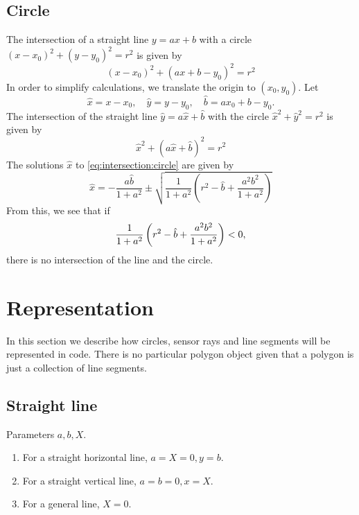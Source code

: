 \documentclass[11pt]{article}
\newcommand{\bhat}{{\hat{b}}}
\newcommand{\xhat}{{\hat{x}}}
\newcommand{\yhat}{{\hat{y}}}
\begin{document}
\subsection{Circle}
\label{sec:intersection:circle}
The intersection of a straight line $y=ax+b$ with a circle 
$(x-x_0)^2+(y-y_0)^2=r^2$ is given by
\begin{equation}
    (x-x_0)^2 + (ax+b - y_0)^2 = r^2 
\end{equation}
In order to simplify calculations, we translate the origin to $(x_0, y_0)$. Let
\begin{equation}
    \xhat = x-x_0,\quad \yhat = y-y_0,\quad \bhat = ax_0 + b - y_0.
\end{equation}
The intersection of the straight line $\yhat = a\xhat + \bhat$ with the circle
$\xhat^2 + \yhat^2 = r^2$ is given by
\begin{equation}
    \xhat^2 + (a\xhat + \bhat)^2 = r^2 \label{eq:intersection:circle}
\end{equation}
The solutions $\xhat$ to \eqref{eq:intersection:circle} are given by
\begin{equation}
    \xhat = -\frac{a\bhat}{1+a^2}\pm 
        \sqrt{\frac{1}{1+a^2}\left(r^2-\bhat+\frac{a^2 b^2}{1+a^2}\right)}
\end{equation}
From this, we see that if 
\begin{equation}
    \frac{1}{1+a^2}\left(r^2-\bhat+\frac{a^2 b^2}{1+a^2}\right) < 0, \notag
\end{equation}
there is no intersection of the line and the circle.

\section{Representation}
\label{sec:representation}
In this section we describe how circles, sensor rays and line segments will be
represented in code. There is no particular polygon object given that a
polygon is just a collection of line segments.

\subsection*{Straight line}

Parameters $a, b, X$. 

\begin{enumerate}
    \item For a  straight horizontal line, $a=X=0, y=b$.
    \item For a  straight vertical line, $a=b=0, x=X$.
    \item For a general line, $X=0$.
\end{enumerate}
\end{document}
